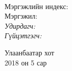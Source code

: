 
\begin{titlepage}
\begin{center}

{\scshape\LARGE \univname\par} %
{\scshape\Large \facname\par}\vspace{0.5cm} %

\vspace{2cm}
\hfill \large{\deptname} \\

\vspace{2cm}

{\huge \bfseries \ttitle\par}\vspace{0.4cm} %

\vspace{2cm}

\begin{minipage}[t] {0.9\textwidth}
\begin{flushleft} 
\normalsize

Мэргэжлийн индекс: \degreeid \\
Мэргэжил: \degreename \\[2cm]

\emph{Удирдагч:} {\supname} \\%
\emph{Гүйцэтгэгч:} {\shortname} \\ %

\end{flushleft}
\end{minipage}

\vfill

\large {Улаанбаатар хот} \\
{\large 2018 он 5 сар}\\ %

\end{center}
\end{titlepage}

 